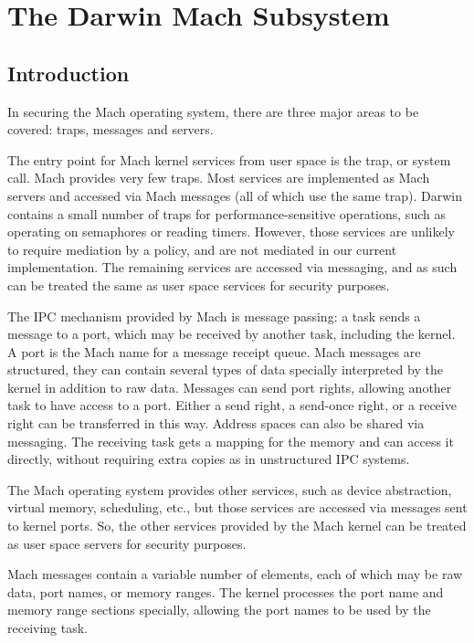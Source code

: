 \section{The Darwin Mach Subsystem}

\subsection{Introduction}

In securing the Mach operating system, there are three major areas
to be covered: traps, messages and servers.

The entry point for Mach kernel services from user space is the
trap, or system call. Mach provides very few traps. Most services
are implemented as Mach servers and accessed via Mach messages (all
of which use the same trap).  Darwin contains a small number of
traps for performance-sensitive operations, such as operating on
semaphores or reading timers.  However, those services are unlikely
to require mediation by a policy, and are not mediated in our current
implementation. The remaining services are accessed via messaging,
and as such can be treated the same as user space services for
security purposes.

The IPC mechanism provided by Mach is message passing: a task sends
a message to a port, which may be received by another task, including
the kernel. A port is the Mach name for a message receipt queue.
Mach messages are structured, they can contain several types of
data specially interpreted by the kernel in addition to raw data.
Messages can send port rights, allowing another task to have access
to a port. Either a send right, a send-once right, or a receive
right can be transferred in this way. Address spaces can also be
shared via messaging. The receiving task gets a mapping for the
memory and can access it directly, without requiring extra copies
as in unstructured IPC systems.

The Mach operating system provides other services, such as device
abstraction, virtual memory, scheduling, etc., but those services are
accessed via messages sent to kernel ports. So, the other services
provided by the Mach kernel can be treated as user space servers for
security purposes.

Mach messages contain a variable number of elements, each of which may be
raw data, port names, or memory ranges. The kernel processes the port name and
memory range sections specially, allowing the port names to be used by the
receiving task.


